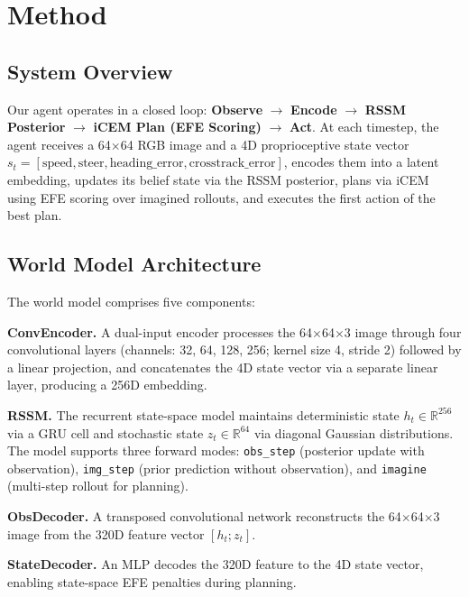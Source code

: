 \documentclass[conference]{IEEEtran}
\begin{document}
\section{Method}
\label{sec:method}

\subsection{System Overview}

Our agent operates in a closed loop: \textbf{Observe} $\rightarrow$ \textbf{Encode} $\rightarrow$ \textbf{RSSM Posterior} $\rightarrow$ \textbf{iCEM Plan (EFE Scoring)} $\rightarrow$ \textbf{Act}. At each timestep, the agent receives a 64$\times$64 RGB image and a 4D proprioceptive state vector $s_t = [\text{speed}, \text{steer}, \text{heading\_error}, \text{crosstrack\_error}]$, encodes them into a latent embedding, updates its belief state via the RSSM posterior, plans via iCEM using EFE scoring over imagined rollouts, and executes the first action of the best plan.

\subsection{World Model Architecture}

The world model comprises five components:

\textbf{ConvEncoder.} A dual-input encoder processes the 64$\times$64$\times$3 image through four convolutional layers (channels: 32, 64, 128, 256; kernel size 4, stride 2) followed by a linear projection, and concatenates the 4D state vector via a separate linear layer, producing a 256D embedding.

\textbf{RSSM.} The recurrent state-space model maintains deterministic state $h_t \in \mathbb{R}^{256}$ via a GRU cell and stochastic state $z_t \in \mathbb{R}^{64}$ via diagonal Gaussian distributions. The model supports three forward modes: \texttt{obs\_step} (posterior update with observation), \texttt{img\_step} (prior prediction without observation), and \texttt{imagine} (multi-step rollout for planning).

\textbf{ObsDecoder.} A transposed convolutional network reconstructs the 64$\times$64$\times$3 image from the 320D feature vector $[h_t; z_t]$.

\textbf{StateDecoder.} An MLP decodes the 320D feature to the 4D state vector, enabling state-space EFE penalties during planning.
\end{document}
